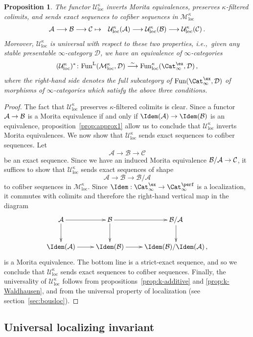 \documentclass{amsart}
\renewcommand{\to}{\mathchoice{\longrightarrow}{\rightarrow}{\rightarrow}{\rightarrow}}
\newcommand{\cA}{{\mathcal A}}
\newcommand{\cB}{{\mathcal B}}
\newcommand{\cC}{{\mathcal C}}
\newcommand{\cD}{{\mathcal D}}
\newcommand{\cM}{{\mathcal M}}
\newcommand{\cU}{{\mathcal U}}
\renewcommand{\L}{\mathrm{L}}
\newcommand{\stabcat}{\Cat_\i^{\ex}}
\newcommand{\idemstabcat}{\Cat_\i^{\perf}}
\newcommand{\Fun}{\mathrm{Fun}} %
\newcommand{\ie}{{i.e.,}\ }
\newcommand{\too}{\longrightarrow}%
\renewcommand{\i}{\infty}
\newcommand{\wMotloc}{\cM_{\mathrm{loc}}^\kappa}
\newcommand{\wUloc}{\cU_{\mathrm{loc}}^\kappa}
\numberwithin{equation}{section}
\newtheorem{proposition}[equation]{Proposition}
\theoremstyle{definition}
\begin{document}
\begin{proposition}\label{prop:k-Morita}
The functor $\wUloc$ inverts Morita equivalences, preserves $\kappa$-filtered colimits, and sends exact sequences to cofiber sequences in $\wMotloc$
\begin{eqnarray*}
\cA \too \cB \too \cC & \mapsto
& \wUloc(\cA) \to \wUloc(\cB) \to \wUloc(\cC) \,.
\end{eqnarray*}
Moreover, $\wUloc$ is universal with respect to these two properties, \ie given any stable presentable $\i$-category $\cD$, we have an equivalence of $\i$-categories
$$ (\wUloc)^{\ast}\colon \Fun^{\L}(\wMotloc, \cD) \stackrel{\sim}{\too} \Fun_{\mathrm{loc}}^\kappa(\stabcat, \cD)\,,$$
where the right-hand side denotes the full subcategory of $\Fun(\stabcat, \cD)$ of morphisms of $\i$-categories which satisfy the above three conditions.
\end{proposition}

\begin{proof}
The fact that $\wUloc$ preserves $\kappa$-filtered colimits is
clear.  Since a functor $\cA \to \cB$ is a Morita equivalence if
and only if  $\Idem(\cA) \to \Idem(\cB)$ is an
equivalence, proposition~\ref{prop:approx1} allow us to conclude that
$\wUloc$ inverts Morita equivalences.  We now show that $\wUloc$ sends
exact sequences to cofiber sequences. Let
\[
\cA \too \cB \too \cC
\]
be an exact sequence. Since we have an induced Morita equivalence
$\cB/\cA \to \cC$, it suffices to show that $\wUloc$ sends exact
sequences of shape
\[
\cA \too \cB \too \cB/\cA
\]
to cofiber sequences in $\wMotloc$. Since $\Idem:\stabcat\to\idemstabcat$ is a localization, it commutes with colimits and therefore the right-hand vertical map in the diagram
\[
\xymatrix{
\cA \ar[r] \ar[d] & \cB \ar[d] \ar[r] & \cB/\cA \ar[d] \\
\Idem(\cA) \ar[r] & \Idem(\cB) \ar[r] & \Idem(\cB)/\Idem(\cA)\,,
}
\]
is a Morita equivalence.  The bottom line is a strict-exact sequence, and so we conclude
that $\wUloc$ sends exact sequences to cofiber sequences.
Finally, the universality of $\wUloc$ follows from
propositions~\ref{prop:k-additive} and \ref{prop:k-Waldhausen}, and
from the universal property of localization (see
section~\ref{sec:bousloc}).
\end{proof}

\subsection{Universal localizing invariant}\label{sec:filtered}
\end{document}

